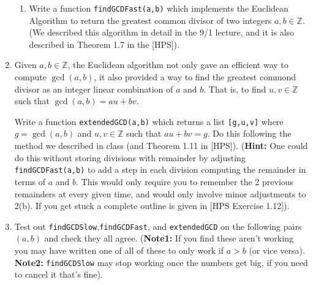 \documentclass[11pt]{article}
\newcommand{\bZ}{\mathbb{Z}}
\begin{document}
\begin{enumerate}
{\begin{enumerate}
{    }
    \item{
    Write a function \verb|findGCDFast(a,b)| which implements the Euclidean Algorithm to return the greatest common divisor of two integers $a,b\in\bZ$.  (We described this algorithm in detail in the 9/1 lecture, and it is also described in Theorem 1.7 in the [HPS]).
    }
  \end{enumerate}
  }
  \item{
  Given $a,b\in\bZ$, the Euclidean algorithm not only gave an efficient way to compute $\gcd(a,b)$, it also provided a way to find the greatest commond divisor as an integer linear combination of $a$ and $b$.  That is, to find $u,v\in\bZ$ such that $\gcd(a,b) = au+bv$.

  Write a function \verb|extendedGCD(a,b)| which returns a list \verb|[g,u,v]| where $g=\gcd(a,b)$ and $u,v\in\bZ$ such that $au+bv = g$.  Do this following the method we described in class (and Theorem 1.11 in [HPS]).  (\textbf{Hint:} One could do this without storing divisions with remainder by adjusting \verb|findGCDFast(a,b)| to add a step in each division computing the remainder in terms of $a$ and $b$.  This would only require you to remember the 2 previous remainders at every given time, and would only involve minor adjustments to 2(b).  If you get stuck a complete outline is given in [HPS Exercise 1.12]).
  }
  \item{
  Test out \verb|findGCDSlow|,\verb|findGCDFast|, and \verb|extendedGCD| on the following pairs $(a,b)$ and check they all agree.  (\textbf{Note1:} If you find these aren't working you may have written one of all of these to only work if $a>b$ (or vice versa). \textbf{Note2:} \verb|findGCDSlow| may stop working once the numbers get big, if you need to cancel it that's fine).
  }
\end{enumerate}
\end{document}
